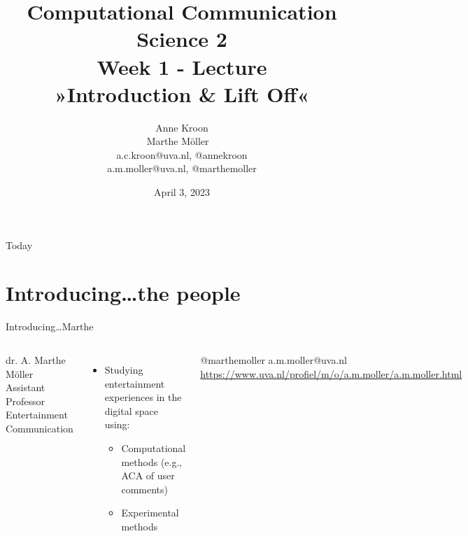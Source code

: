 \documentclass[handout]{beamer}
\title[Computational Communication Science 2]{\textbf{Computational Communication Science 2} \\Week 1 - Lecture\\ »Introduction \& Lift Off«}
\author[Anne Kroon, Marthe Möller]{Anne Kroon \\ Marthe Möller ~ \\ \footnotesize{a.c.kroon@uva.nl, @annekroon} \\a.m.moller@uva.nl, @marthemoller }
\date{April 3, 2023}
\institute[Digital Society Minor, University of Amsterdam]{Digital Society Minor, University of Amsterdam}
\begin{document}
	\begin{frame}{}
		\titlepage
	\end{frame}
	
\begin{frame}{Today}
	\tableofcontents
\end{frame}

\section[The people]{Introducing\ldots the people}

\begin{frame}{Introducing\ldots \huge{Marthe}} 
	\begin{columns}
		dr. A. Marthe Möller \\
		Assistant Professor Entertainment Communication
		\begin{itemize}
			\item Studying entertainment experiences in the digital space using:
			\begin{itemize}
				\item Computational methods (e.g., ACA of user comments)
				\item Experimental methods
			\end{itemize}
		\end{itemize}
		@marthemoller \textbar a.m.moller@uva.nl \textbar \url{https://www.uva.nl/profiel/m/o/a.m.moller/a.m.moller.html} 
	\end{columns}
\end{frame}
\end{document}
